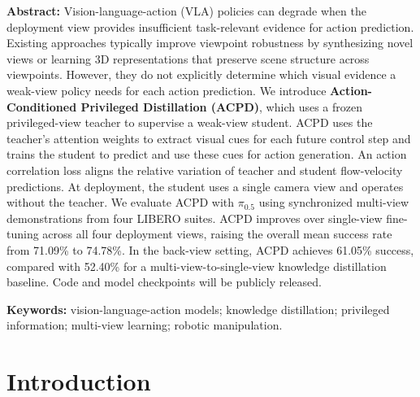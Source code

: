 \documentclass{ELSP}
\begin{document}
\vspace{10pt}
\noindent\textbf{\textbf{\textcolor[RGB]{0,131,255}{Abstract:}}} Vision-language-action (VLA) policies can degrade when the deployment view provides insufficient task-relevant evidence for action prediction.
Existing approaches typically improve viewpoint robustness by synthesizing novel views or learning 3D representations that preserve scene structure across viewpoints. However, they do not explicitly determine which visual evidence a weak-view policy needs for each action prediction. We introduce \textbf{Action-Conditioned Privileged Distillation (ACPD)}, which uses a frozen privileged-view teacher to supervise a weak-view student. ACPD uses the teacher's attention weights to extract visual cues for each future control step and trains the student to predict and use these cues for action generation. An action correlation loss aligns the relative variation of teacher and student flow-velocity predictions. At deployment, the student uses a single camera view and operates without the teacher.
We evaluate ACPD with $\pi_{0.5}$ using synchronized multi-view demonstrations from four LIBERO suites. ACPD improves over single-view fine-tuning across all four deployment views, raising the overall mean success rate from 71.09\% to 74.78\%. In the back-view setting, ACPD achieves 61.05\% success, compared with 52.40\% for a multi-view-to-single-view knowledge distillation baseline.
Code and model checkpoints will be publicly released.

\vspace{12pt}
\noindent\textbf{\textcolor[RGB]{0,131,255}{Keywords:}} vision-language-action models; knowledge distillation; privileged information; multi-view learning; robotic manipulation.

% 
% 

\section{Introduction}
\end{document}

